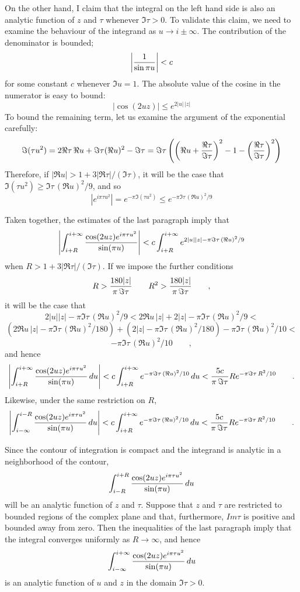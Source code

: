 \documentclass[12pt]{article}
\begin{document}
On the other hand, I claim that the integral on the left hand side is also an  analytic function of $z$ and $\tau$ whenever $\Im \tau > 0$.  To validate this claim, we need to examine the behaviour of the integrand as $u \to i \pm \infty$.  The contribution of the denominator is bounded;
 $$\left| {1 \over \sin \pi u} \right| < c$$
for some constant $c$ whenever $\Im u = 1$.  The absolute value of the cosine in the numerator is easy to bound:
 $$|\cos (2 u z)| \le e^{2 |u| \, |z|}$$
To bound the remaining term, let us examine the argument of the exponential carefully:
 $$\Im (\tau u^2) = 2 \Re \tau \, \Re u + \Im \tau (\Re u)^2 - \Im \tau = \Im \tau \left( \left( \Re u + {\Re \tau \over \Im \tau} \right)^2 - 1 - \left( {\Re \tau \over \Im \tau} \right)^2 \right)$$
Therefore, if $|\Re u| > 1 + 3 |\Re \tau|/(\Im \tau)$, it will be the case that $\Im (\tau u^2) \ge \Im \tau \, (\Re u)^2 / 9$, and so
 $$\left| e^{i \pi \tau u^2} \right| = e^{-\pi \Im (\tau u^2)} \le e^{-\pi \Im \tau \, (\Re u)^2 / 9}$$

Taken together, the estimates of the last paragraph imply that
 $$\left| \int_{i + R}^{i + \infty} {\cos (2 u z) e^{i \pi \tau u^2} \over \sin (\pi u)} \right| < c \int_{i + R}^{i + \infty} e^{2 |u| |z| -\pi \Im \tau \, (\Re u)^2 / 9}$$
when $R > 1 + 3 |\Re \tau|/(\Im \tau)$.  If we impose the further conditions
 $$R > {180 |z| \over \pi \, \Im \tau} \qquad R^2 > {180 |z| \over \pi \, \Im \tau} \qquad,$$ 
it will be the case that
 $$2 |u| |z| - \pi \Im \tau \, (\Re u)^2 / 9 < 2 \Re u \, |z|  + 2 |z| - \pi \Im \tau \, (\Re u)^2 / 9 < $$ 
$$\left( 2 \Re u \, |z| - \pi \Im \tau \, (\Re u)^2 / 180 \right) + \left( 2 |z| - \pi \Im \tau \, (\Re u)^2 / 180 \right) - \pi \Im \tau \, (\Re u)^2 / 10 <$$ 
 $$- \pi \Im \tau \, (\Re u)^2 / 10 \qquad,$$ 
and hence 
 $$\left| \int_{i + R}^{i + \infty} {\cos (2 u z) e^{i \pi \tau u^2} \over \sin (\pi u)} \, du \right| < c \int_{i + R}^{i + \infty} e^{-\pi \Im \tau \, (\Re u)^2 / 10} \, du < {5 c \over \pi \, \Im \tau} R e^{-\pi \Im \tau \, R^2 / 10} \qquad.$$
Likewise, under the same restriction on $R$,
 $$\left| \int_{i - \infty}^{i - R} {\cos (2 u z) e^{i \pi \tau u^2} \over \sin (\pi u)} \, du \right| < c \int_{i + R}^{i + \infty} e^{-\pi \Im \tau \, (\Re u)^2 / 10} \, du < {5 c \over \pi \, \Im \tau} R e^{-\pi \Im \tau \, R^2 / 10} \qquad.$$

Since the contour of integration is compact and the integrand is analytic in a neighborhood of the contour,
 $$\int_{i - R}^{i + R} {\cos (2 u z) e^{i \pi \tau u^2} \over \sin (\pi u)} \, du$$
will be an analytic function of $z$ and $\tau$.  Suppose that $z$ and $\tau$ are restricted to bounded regions of the complex plane and that, furthermore, $Im \tau$ is positive and bounded away from zero.  Then the inequalities of the last paragraph imply that the integral converges uniformly as $R \to \infty$, and hence
 $$\int_{i - \infty}^{i + \infty} {\cos (2 u z) e^{i \pi \tau u^2} \over \sin (\pi u)} \, du$$ is an analytic function of $u$ and $z$ in the domain $\Im \tau > 0$.
\end{document}
